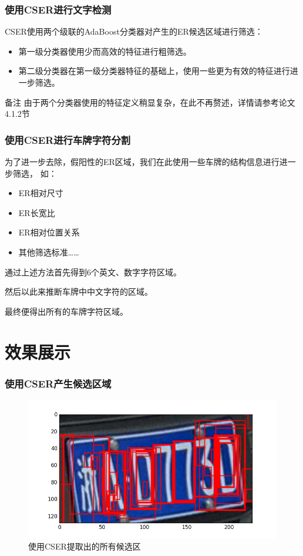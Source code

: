 \documentclass[UTF8]{beamer}
\begin{document}
\begin{frame}
  \frametitle{使用CSER进行文字检测}
  
  CSER使用两个级联的AdaBoost分类器对产生的ER候选区域进行筛选：

  \begin{itemize}
  \item 第一级分类器使用少而高效的特征进行粗筛选。
  \item 第二级分类器在第一级分类器特征的基础上，使用一些更为有效的特征进行进一步筛选。
  \end{itemize}
  
  \begin{block}{备注}
    由于两个分类器使用的特征定义稍显复杂，在此不再赘述，详情请参考论文4.1.2节
  \end{block}
\end{frame}

\begin{frame}
  \frametitle{使用CSER进行车牌字符分割}
  
  为了进一步去除，假阳性的ER区域，我们在此使用一些车牌的结构信息进行进一步筛选，
  如：
  
  \begin{itemize}
    \item ER相对尺寸
    \item ER长宽比
    \item ER相对位置关系
    \item 其他筛选标准……
  \end{itemize}

  通过上述方法首先得到6个英文、数字字符区域。

  然后以此来推断车牌中中文字符的区域。

  最终便得出所有的车牌字符区域。
\end{frame}

\section{效果展示}

\begin{frame}
  \frametitle{使用CSER产生候选区域}
  
  \begin{figure}[ht]
    \centering
    \includegraphics[height=0.6\textheight]{./Figure/AllERs.png}
    \caption{使用CSER提取出的所有候选区}\label{Fig:AllERs}
  \end{figure}
\end{frame}
\end{document}
